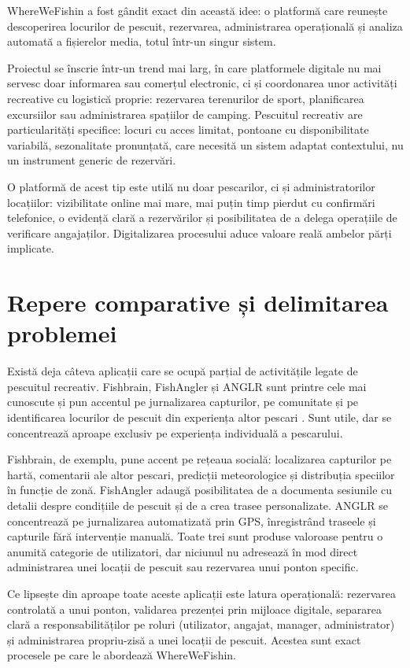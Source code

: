 WhereWeFishin a fost gândit exact din această idee: o platformă care reunește descoperirea locurilor de pescuit, rezervarea, administrarea operațională și analiza automată a fișierelor media, totul într-un singur sistem.

Proiectul se înscrie într-un trend mai larg, în care platformele digitale nu mai servesc doar informarea sau comerțul electronic, ci și coordonarea unor activități recreative cu logistică proprie: rezervarea terenurilor de sport, planificarea excursiilor sau administrarea spațiilor de camping. Pescuitul recreativ are particularități specifice: locuri cu acces limitat, pontoane cu disponibilitate variabilă, sezonalitate pronunțată, care necesită un sistem adaptat contextului, nu un instrument generic de rezervări.

O platformă de acest tip este utilă nu doar pescarilor, ci și administratorilor locațiilor: vizibilitate online mai mare, mai puțin timp pierdut cu confirmări telefonice, o evidență clară a rezervărilor și posibilitatea de a delega operațiile de verificare angajaților. Digitalizarea procesului aduce valoare reală ambelor părți implicate.

\section{Repere comparative și delimitarea problemei}

Există deja câteva aplicații care se ocupă parțial de activitățile legate de pescuitul recreativ. Fishbrain, FishAngler și ANGLR sunt printre cele mai cunoscute și pun accentul pe jurnalizarea capturilor, pe comunitate și pe identificarea locurilor de pescuit din experiența altor pescari \citep{fishbrain,fishangler,anglr}. Sunt utile, dar se concentrează aproape exclusiv pe experiența individuală a pescarului.

Fishbrain, de exemplu, pune accent pe rețeaua socială: localizarea capturilor pe hartă, comentarii ale altor pescari, predicții meteorologice și distribuția speciilor în funcție de zonă. FishAngler adaugă posibilitatea de a documenta sesiunile cu detalii despre condițiile de pescuit și de a crea trasee personalizate. ANGLR se concentrează pe jurnalizarea automatizată prin GPS, înregistrând traseele și capturile fără intervenție manuală. Toate trei sunt produse valoroase pentru o anumită categorie de utilizatori, dar niciunul nu adresează în mod direct administrarea unei locații de pescuit sau rezervarea unui ponton specific.

Ce lipsește din aproape toate aceste aplicații este latura operațională: rezervarea controlată a unui ponton, validarea prezenței prin mijloace digitale, separarea clară a responsabilităților pe roluri (utilizator, angajat, manager, administrator) și administrarea propriu-zisă a unei locații de pescuit. Acestea sunt exact procesele pe care le abordează WhereWeFishin.

